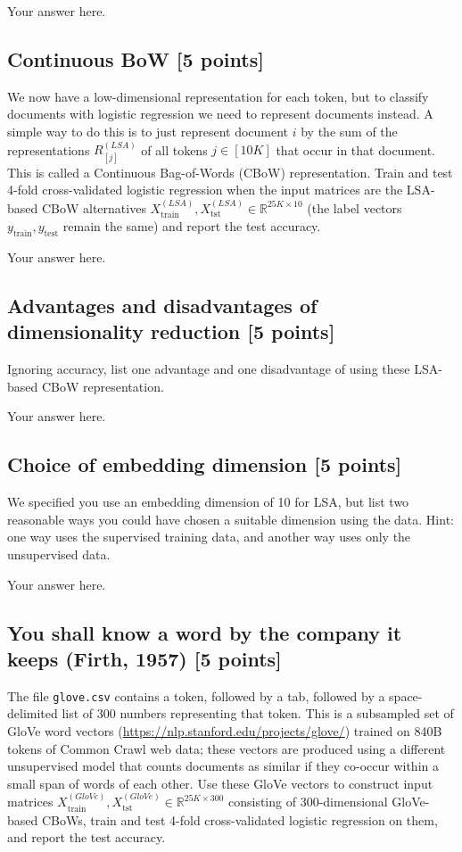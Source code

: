 \documentclass[a4paper]{article}
\theoremstyle{definition}
\begin{document}
{\color{blue}
	Your answer here.
}

\subsection{Continuous BoW [5 points]}
We now have a low-dimensional representation for each token, but to classify documents with logistic regression we need to represent documents instead.
A simple way to do this is to just represent document $i$ by the sum of the representations $R_{[j]}^{(LSA)}$ of all tokens $j\in[10K]$ that occur in that document.
This is called a Continuous Bag-of-Words (CBoW) representation.
Train and test 4-fold cross-validated logistic regression when the input matrices are the LSA-based CBoW alternatives $X_\textrm{train}^{(LSA)},X_\textrm{tst}^{(LSA)}\in\mathbb{R}^{25K\times10}$ (the label vectors $y_\textrm{train},y_\textrm{test}$ remain the same) and report the test accuracy.

{\color{blue}
	Your answer here.
}

\subsection{Advantages and disadvantages of dimensionality reduction [5 points]}

Ignoring accuracy, list one advantage and one disadvantage of using these LSA-based CBoW representation.

{\color{blue}
	Your answer here.
}

\subsection{Choice of embedding dimension [5 points]}

We specified you use an embedding dimension of 10 for LSA, but list two reasonable ways you could have chosen a suitable dimension using the data.
Hint: one way uses the supervised training data, and another way uses only the unsupervised data.

{\color{blue}
	Your answer here.
}

\subsection{You shall know a word by the company it keeps (Firth, 1957) [5 points]}

The file {\tt glove.csv} contains a token, followed by a tab, followed by a space-delimited list of 300 numbers representing that token.
This is a subsampled set of GloVe word vectors (\url{https://nlp.stanford.edu/projects/glove/}) trained on 840B tokens of Common Crawl web data;
these vectors are produced using a different unsupervised model that counts documents as similar if they co-occur within a small span of words of each other.
Use these GloVe vectors to construct input matrices $X_\textrm{train}^{(GloVe)},X_\textrm{tst}^{(GloVe)}\in\mathbb{R}^{25K\times300}$ consisting of 300-dimensional GloVe-based CBoWs, train and test 4-fold cross-validated logistic regression on them, and report the test accuracy.
\end{document}
